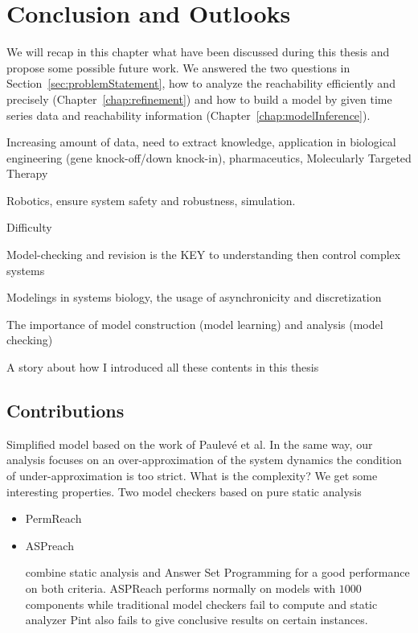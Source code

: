 \chapter{Conclusion and Outlooks}\label{chap:conclusion}
\begin{mybox}
We will recap in this chapter what have been discussed during this thesis and propose some possible future work.
We answered the two questions in Section~\ref{sec:problemStatement}, how to analyze the reachability efficiently and precisely (Chapter~\ref{chap:refinement}) and how to build a model by given time series data and reachability information (Chapter~\ref{chap:modelInference}).

\end{mybox}


Increasing amount of data, need to extract knowledge, application in biological engineering (gene knock-off/down  knock-in), pharmaceutics, Molecularly Targeted Therapy

Robotics, ensure system safety and robustness, simulation.

Difficulty

Model-checking and revision is the KEY to understanding then control complex systems 

Modelings in systems biology, the usage of asynchronicity and discretization

The importance of model construction (model learning) and analysis (model checking)
    
A story about how I introduced all these contents in this thesis 

\section{Contributions}

Simplified model based on the work of Paulev\'e et al.
In the same way, our analysis focuses on an over-approximation of the system dynamics 
the condition of under-approximation is too strict.
What is the complexity?
We get some interesting properties.
Two model checkers based on pure static analysis
\begin{itemize}
    \item PermReach
    \item ASPreach
    
    combine static analysis and Answer Set Programming for a good performance on both criteria.
ASPReach performs normally on models with $1000$ components while traditional model checkers fail to compute and static analyzer Pint also fails to give conclusive results on certain instances.
\end{itemize}


